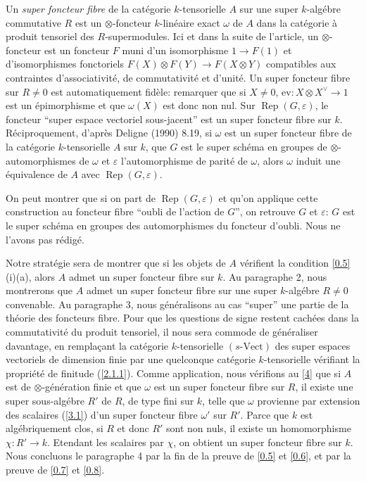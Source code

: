 \documentclass[11pt,a4paper]{article}
\theoremstyle{plain}
\theoremstyle{definition}
\newcommand{\ev}{\mathrm{ev}}
\newcommand{\Vect}{\mathrm{Vect}}
\newcommand{\Rep}{\operatorname{Rep}}
\begin{document}
Un \emph{super foncteur fibre} de la cat\'egorie $k$-tensorielle $A$ sur une super $k$-alg\'ebre commutative $R$ est un $\otimes$-foncteur $k$-lin\'eaire exact $\omega$ de $A$ dans la cat\'egorie \`a produit tensoriel des $R$-supermodules. Ici et dans la suite de l'article, un $\otimes$-foncteur est un foncteur $F$ muni d'un isomorphisme $1\to F(1)$ et d'isomorphismes fonctoriels $F(X)\otimes F(Y)\to F(X\otimes Y)$ compatibles aux contraintes d'associativit\'e, de commutativit\'e et d'unit\'e. Un super foncteur fibre sur $R\neq0$ est automatiquement fid\`ele: remarquer que si $X\neq0$, $\ev:X\otimes X^\vee\to 1$ est un \'epimorphisme et que $\omega(X)$ est donc non nul. Sur $\Rep(G,\varepsilon)$, le foncteur ``super espace vectoriel sous-jacent'' est un super foncteur fibre sur $k$. R\'eciproquement, d'apr\`es Deligne (1990) 8.19, si $\omega$ est un super foncteur fibre de la cat\'egorie $k$-tensorielle $A$ sur $k$, que $G$ est le super sch\'ema en groupes de $\otimes$-automorphismes de $\omega$ et $\varepsilon$ l'automorphisme de parit\'e de $\omega$, alors $\omega$ induit une \'equivalence de $A$ avec $\Rep(G,\varepsilon)$.

On peut montrer que si on part de $\Rep(G,\varepsilon)$ et qu'on applique cette construction au foncteur fibre ``oubli de l'action de $G$'', on retrouve $G$ et $\varepsilon$: $G$ est le super sch\'ema en groupes des automorphismes du foncteur d'oubli. Nous ne l'avons pas r\'edig\'e.

Notre strat\'egie sera de montrer que si les objets de $A$ v\'erifient la condition \ref{0.5}(i)(a), alors $A$ admet un super foncteur fibre sur $k$. Au paragraphe 2, nous montrerons que $A$ admet un super foncteur fibre sur une super $k$-alg\'ebre $R\neq0$ convenable. Au paragraphe 3, nous g\'en\'eralisons au cas ``super'' une partie de la th\'eorie des foncteurs fibre. Pour que les questions de signe restent cach\'ees dans la commutativit\'e du produit tensoriel, il nous sera commode de g\'en\'eraliser davantage, en rempla\c{c}ant la cat\'egorie $k$-tensorielle $(s\text{-}\Vect)$ des super espaces vectoriels de dimension finie par une quelconque cat\'egorie $k$-tensorielle v\'erifiant la propri\'et\'e de finitude (\ref{2.1.1}). Comme application, nous v\'erifions au \ref{4} que si $A$ est de $\otimes$-g\'en\'eration finie et que $\omega$ est un super foncteur fibre sur $R$, il existe une super sous-alg\'ebre $R'$ de $R$, de type fini sur $k$, telle que $\omega$ provienne par extension des scalaires (\ref{3.1}) d'un super foncteur fibre $\omega'$ sur $R'$. Parce que $k$ est alg\'ebriquement clos, si $R$ et donc $R'$ sont non nuls, il existe un homomorphisme $\chi:R'\to k$. Etendant les scalaires par $\chi$, on obtient un super foncteur fibre sur $k$. Nous concluons le paragraphe 4 par la fin de la preuve de \ref{0.5} et \ref{0.6}, et par la preuve de \ref{0.7} et \ref{0.8}.
\end{document}
